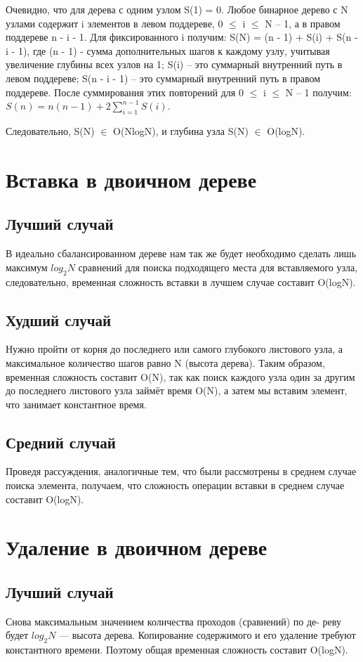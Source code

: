 \documentclass[otchet]{SCWorks}
\begin{document}
Очевидно, что для дерева с одним узлом S(1) = 0. Любое бинарное дерево с N узлами содержит i элементов в левом поддереве, 0 $\leq$ i $\leq$ N – 1, а в правом поддереве n - i - 1. Для фиксированного i получим: S(N) = (n - 1) + S(i) + S(n - i - 1), где  (n - 1)  - сумма дополнительных шагов к каждому узлу, учитывая увеличение глубины всех узлов на 1; S(i) – это суммарный внутренний путь в левом поддереве; S(n - i - 1) – это суммарный внутренний путь в правом поддереве. После суммирования этих повторений для 0 $\leq$ i $\leq$ N – 1 получим: $S(n) = n(n-1) + 2\sum\limits_{i=1}^{n-1} S(i)$.

Следовательно, S(N) $\in$ O(NlogN), и глубина узла S(N) $\in$ O(logN).

\section{Вставка в двоичном дереве}
\subsection{Лучший случай}
В идеально сбалансированном дереве нам так же будет необходимо сделать лишь максимум $log_2 N$ сравнений для поиска подходящего места для вставляемого узла, следовательно, временная сложность вставки в лучшем случае составит O(logN).

\subsection{Худший случай}
Нужно пройти от корня до последнего или самого глубокого листового узла, а максимальное количество шагов равно N (высота дерева). Таким образом, временная сложность составит O(N), так как поиск каждого узла один за другим до последнего листового узла займёт время O(N), а затем мы вставим элемент, что занимает константное время.

\subsection{Средний случай}
Проведя рассуждения, аналогичные тем, что были рассмотрены в среднем случае поиска элемента, получаем, что сложность операции вставки в среднем случае составит O(logN).

\section{Удаление в двоичном дереве}
\subsection{Лучший случай}
Снова максимальным значением количества проходов (сравнений) по де- реву будет $log_2 N$ — высота дерева. Копирование содержимого и его удаление требуют константного времени. Поэтому общая временная сложность составит O(logN).
\end{document}
